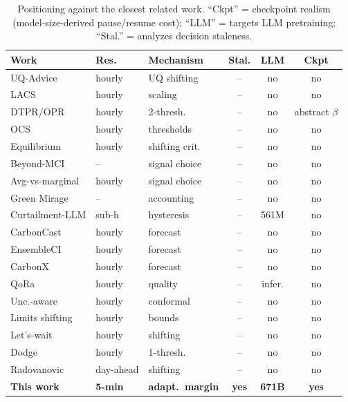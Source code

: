 \documentclass[sigconf,nonacm=false]{acmart}
\begin{document}
\begin{table}[t]
  \caption{Positioning against the closest related work. ``Ckpt'' = checkpoint
  realism (model-size-derived pause/resume cost); ``LLM'' = targets LLM
  pretraining; ``Stal.'' = analyzes decision staleness.}
  \label{tab:positioning}
  \small
  \begin{tabular}{@{}p{3.0cm} p{1.2cm} p{2.4cm} c c c@{}}
    \toprule
    Work & Res. & Mechanism & Stal. & LLM & Ckpt \\
    \midrule
    UQ-Advice \cite{johnson2025uqadvice} & hourly & UQ shifting & -- & no & no \\
    LACS \cite{bostandoost2024lacs} & hourly & scaling & -- & no & no \\
    DTPR/OPR \cite{lechowicz2023opr} & hourly & 2-thresh. & -- & no & abstract $\beta$ \\
    OCS \cite{lechowicz2024ocs} & hourly & thresholds & -- & no & no \\
    Equilibrium \cite{jiang2026equilibrium} & hourly & shifting crit. & -- & no & no \\
    Beyond-MCI \cite{wiesner2025beyondmci} & -- & signal choice & -- & no & no \\
    Avg-vs-marginal \cite{sukprasert2024avm} & hourly & signal choice & -- & no & no \\
    Green Mirage \cite{maji2024greenmirage} & -- & accounting & -- & no & no \\
    Curtailment-LLM \cite{wiesner2026curtailment} & sub-h & hysteresis & -- & 561M & no \\
    CarbonCast \cite{maji2023carboncast} & hourly & forecast & -- & no & no \\
    EnsembleCI \cite{yan2025ensembleci} & hourly & forecast & -- & no & no \\
    CarbonX \cite{maji2025carbonx} & hourly & forecast & -- & no & no \\
    QoRa \cite{wiesner2025qora} & hourly & quality & -- & infer. & no \\
    Unc.-aware \cite{li2024uncertainty} & hourly & conformal & -- & no & no \\
    Limits shifting \cite{sukprasert2024limitations} & hourly & bounds & -- & no & no \\
    Let's-wait \cite{wiesner2021letswait} & hourly & shifting & -- & no & no \\
    Dodge \cite{dodge2022measuring} & hourly & 1-thresh. & -- & no & no \\
    Radovanovic \cite{radovanovic2022carbon} & day-ahead & shifting & -- & no & no \\
    \midrule
    \textbf{This work} & \textbf{5-min} & \textbf{adapt.\ margin} & \textbf{yes} & \textbf{671B} & \textbf{yes} \\
    \bottomrule
  \end{tabular}
\end{table}
\end{document}
